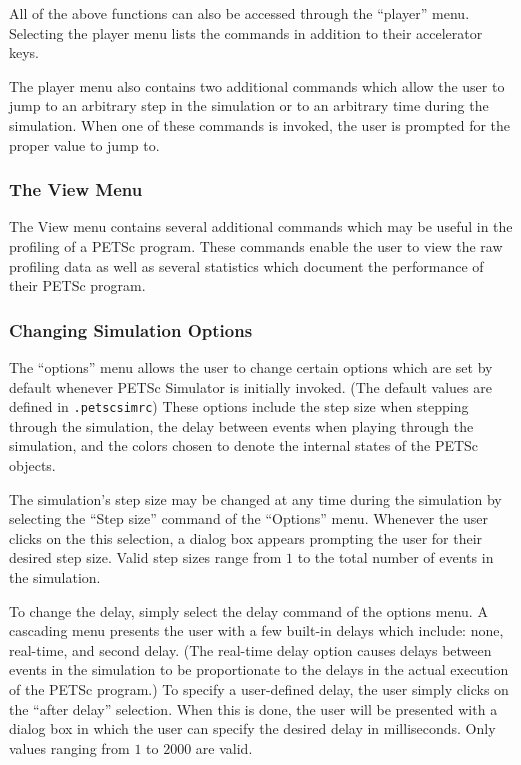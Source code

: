 All of the above functions can also be accessed through the ``player'' menu.  Selecting the player menu lists the commands in addition to their accelerator keys.

The player menu also contains two additional commands which allow the user to jump to an arbitrary step in the simulation or to an arbitrary time during the simulation.  When one of these commands is invoked, the user is prompted for the proper value to jump to.  

\subsubsection{The View Menu}

The View menu contains several additional commands which may be useful in the profiling of a PETSc program.  These commands enable the user to view the raw profiling data as well as several statistics which document the performance of their PETSc program.

\subsubsection{Changing Simulation Options}

The ``options'' menu allows the user to change certain options which are set by default whenever PETSc Simulator is initially invoked.  (The default values are defined in {\tt .petscsimrc})  These options include the step size when stepping through the simulation, the delay between events when playing through the simulation, and the colors chosen to denote the internal states of the PETSc objects. 

The simulation's step size may be changed at any time during the simulation by selecting the ``Step size'' command of the ``Options'' menu.  Whenever the user clicks on the this selection, a dialog box appears prompting the user for their desired step size.  Valid step sizes range from $1$ to the total number of events in the simulation.

To change the delay, simply select the delay command of the options menu.  A cascading menu presents the user with a few built-in delays which include: none, real-time, and second delay.  (The real-time delay option causes delays between events in the simulation to be proportionate to the delays in the actual execution of the PETSc program.)  To specify a user-defined delay, the user simply clicks on the ``after delay'' selection.  When this is done, the user will be presented with a dialog box in which the user can specify the desired delay in milliseconds.  Only values ranging from $1$ to $2000$ are valid.

